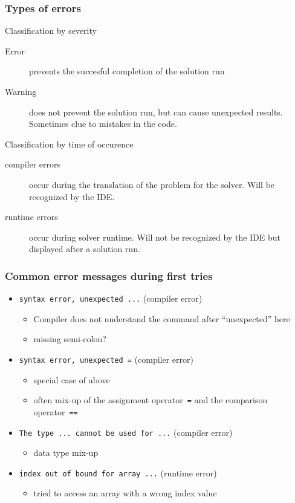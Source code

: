 \begin{frame}
 \frametitle{Types of errors}
 \begin{block}{Classification by severity}
  \begin{description}
   \item[Error] prevents the succesful completion of the solution run
   \item[Warning] does not prevent the solution run, but can cause unexpected results. Sometimes clue to mistakes in the code.
  \end{description}
 \end{block}
 \begin{block}{Classification by time of occurence}
  \begin{description}
   \item[compiler errors] occur during the translation of the problem for the solver. Will be recognized by the IDE.
   \item[runtime errors] occur during solver runtime. Will not be recognized by the IDE but displayed after a solution run.
  \end{description}
 \end{block}
\end{frame}

\begin{frame}
 \frametitle{Common error messages during first tries}
 \begin{itemize}
  \item \texttt{syntax error, unexpected ...} (compiler error)
  \begin{itemize}
   \item Compiler does not understand the command after "`unexpected"' here
   \item missing semi-colon?
  \end{itemize}
  \item \texttt{syntax error, unexpected =} (compiler error)
  \begin{itemize}
   \item special case of above
   \item often mix-up of the assignment operator~\texttt{=} and the comparison operator~\texttt{==}
  \end{itemize}
  \item \texttt{The type ... cannot be used for ...} (compiler error)
  \begin{itemize}
   \item data type mix-up
  \end{itemize}
  \item \texttt{index out of bound for array ...} (runtime error)
  \begin{itemize}
   \item tried to access an array with a wrong index value
  \end{itemize}
 \end{itemize}
\end{frame}

